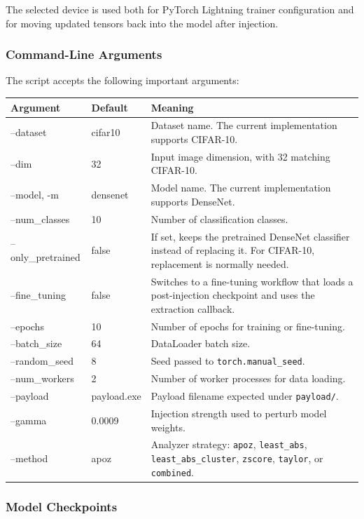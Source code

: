 \documentclass[11pt,a4paper]{article}
\newcommand{\code}[1]{\texttt{#1}}
\begin{document}
The selected device is used both for PyTorch Lightning trainer configuration and for moving updated tensors back into the model after injection.

\subsubsection{Command-Line Arguments}

The script accepts the following important arguments:

\begin{longtable}{>{\ttfamily}p{}p{}p{}}
\textbf{Argument} & \textbf{Default} & \textbf{Meaning} \\
\hline
\endhead
--dataset & cifar10 & Dataset name. The current implementation supports CIFAR-10. \\
--dim & 32 & Input image dimension, with 32 matching CIFAR-10. \\
--model, -m & densenet & Model name. The current implementation supports DenseNet. \\
--num\_classes & 10 & Number of classification classes. \\
--only\_pretrained & false & If set, keeps the pretrained DenseNet classifier instead of replacing it. For CIFAR-10, replacement is normally needed. \\
--fine\_tuning & false & Switches to a fine-tuning workflow that loads a post-injection checkpoint and uses the extraction callback. \\
--epochs & 10 & Number of epochs for training or fine-tuning. \\
--batch\_size & 64 & DataLoader batch size. \\
--random\_seed & 8 & Seed passed to \code{torch.manual\_seed}. \\
--num\_workers & 2 & Number of worker processes for data loading. \\
--payload & payload.exe & Payload filename expected under \code{payload/}. \\
--gamma & 0.0009 & Injection strength used to perturb model weights. \\
--method & apoz & Analyzer strategy: \code{apoz}, \code{least\_abs}, \code{least\_abs\_cluster}, \code{zscore}, \code{taylor}, or \code{combined}. \\
\end{longtable}

\subsubsection{Model Checkpoints}
\end{document}
